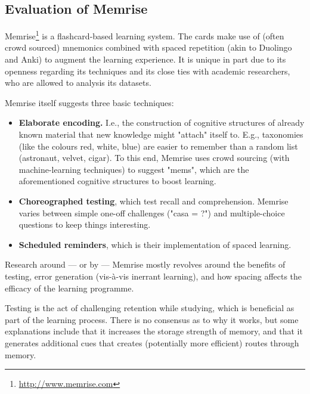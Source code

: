 \subsection{Evaluation of Memrise}

Memrise\footnote{\url{http://www.memrise.com}} is a flashcard-based learning 
system. The cards make use of (often crowd sourced) mnemonics combined with 
spaced repetition (akin to Duolingo and Anki) to augment the learning 
experience. It is unique in part due to its openness regarding its techniques 
and its close ties with academic researchers, who are allowed to analysis its 
datasets.

Memrise itself suggests three basic techniques:\cite{memrise}

\begin{itemize}

\item \textbf{Elaborate encoding.} I.e., the construction of cognitive 
  structures of already known material that new knowledge might "attach" 
  itself to. E.g., taxonomies (like the colours red, white, blue) are easier 
  to remember than a random list (astronaut, velvet, cigar). To this end, 
  Memrise uses crowd sourcing (with machine-learning techniques) to suggest 
  "mems", which are the aforementioned cognitive structures to boost learning.

\item \textbf{Choreographed testing}, which test recall and comprehension. Memrise varies
  between simple one-off challenges ("casa = ?") and multiple-choice questions
  to keep things interesting.

\item \textbf{Scheduled reminders}, which is their implementation of spaced 
    learning.

\end{itemize}

Research around — or by — Memrise mostly revolves around the benefits of 
testing, error generation (vis-à-vis inerrant learning), and how spacing 
affects the efficacy of the learning programme.

Testing is the act of challenging retention while studying, which is 
beneficial as part of the learning process. There is no consensus as to why it 
works, but some explanations include that it increases the storage strength of 
memory, and that it generates additional cues that creates (potentially more 
efficient) routes through memory\cite[p.6]{potts2014benefit}.


